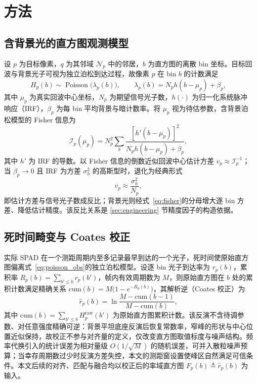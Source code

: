 
\section{方法}
\label{sec:method}

\subsection{含背景光的直方图观测模型}
\label{sec:spad}

设 $p$ 为目标像素，$q$ 为其邻域 $\mathcal{N}_p$ 中的邻居，$b$ 为直方图的离散 bin 坐标。目标回波与背景光子可视为独立泊松到达过程，故像素 $p$ 在 bin $b$ 的计数满足
\begin{equation}
  H_p(b)\sim\operatorname{Poisson}\!\big(\lambda_p(b)\big),
  \qquad
  \lambda_p(b)=N_p h(b-\mu_p)+\beta_p,
  \label{eq:poisson_obs}
\end{equation}
其中 $\mu_p$ 为真实回波中心坐标，$N_p$ 为期望信号光子数，$h(\cdot)$ 为归一化系统脉冲响应（IRF），$\beta_p$ 为每 bin 平均背景与暗计数率。将 $\mu_p$ 视为待估参数，含背景泊松模型的 Fisher 信息为
\begin{equation}
  \mathcal{I}_p(\mu_p)
  =N_p^2\sum_b\frac{[h'(b-\mu_p)]^2}{N_p h(b-\mu_p)+\beta_p},
  \label{eq:fisher}
\end{equation}
其中 $h'$ 为 IRF 的导数。以 Fisher 信息的倒数近似回波中心估计方差 $v_p\approx\mathcal{I}_p^{-1}$；当 $\beta_p\rightarrow0$ 且 IRF 为方差 $\sigma_h^2$ 的高斯型时，退化为经典形式
\begin{equation}
  v_p\approx\frac{\sigma_h^2}{N_p},
  \label{eq:v_classical}
\end{equation}
即估计方差与信号光子数成反比；背景光则经式~\eqref{eq:fisher}的分母增大逐 bin 方差、降低估计精度。该反比关系是 \ref{sec:engineering} 节精度因子的构造依据。

\subsection{死时间畸变与 Coates 校正}
\label{sec:coates}

实际 SPAD 在一个测距周期内至多记录最早到达的一个光子，死时间使原始直方图偏离式~\eqref{eq:poisson_obs}的独立泊松模型。设逐 bin 光子到达率为 $r_p(b)$，累积率 $R_p(b)=\sum_{b'\le b}r_p(b')$，帧内有效周期数为 $M$，则原始直方图在 $b$ 处的累积计数满足精确关系 $\mathrm{cum}(b)=M\big(1-e^{-R_p(b)}\big)$，其解析逆（Coates 校正）为
\begin{equation}
  \hat r_p(b)=\ln\frac{M-\mathrm{cum}(b-1)}{M-\mathrm{cum}(b)},
  \label{eq:coates}
\end{equation}
其中 $\mathrm{cum}(b)=\sum_{b'\le b}H_p^{\mathrm{raw}}(b')$ 为原始直方图累积计数。该反演不含待调参数、对任意强度精确可逆：背景平坦底座反演后恢复常数率，窄峰的形状与中心位置近似保持，故校正不参与对齐量的定义，仅改变直方图取值标度与噪声结构。频率代换引入的统计误差为相对量级 $O(1/\sqrt{M})$ 的随机误差，可并入散粒噪声预算；当幸存周期数过少时反演方差失控，本文的测距窗设置使峰区自然满足可信条件。本文后续的对齐、匹配与融合均以校正后的率域直方图 $F_p(b)\triangleq\hat r_p(b)$ 为输入。

